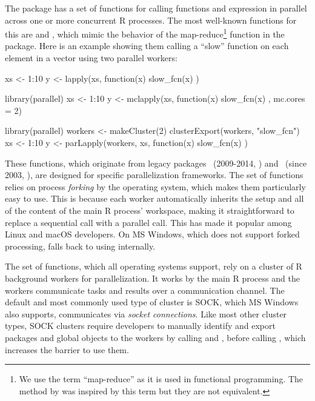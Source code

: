 The  package has a set of functions for calling
functions and expression in parallel across one or more concurrent R
processes. The most well-known functions for this
are  and , which mimic the behavior
of the map-reduce\footnote{We use the term ``map-reduce'' as it is
used in functional programming. The  method by
\citet{DeanGhemawat2004} was inspired by this term but they are not
equivalent.}
function  in the  package.  Here is an
example showing them calling a ``slow'' function on each element in a
vector using two parallel workers:
%
\begin{example}
xs <- 1:10
y <- lapply(xs, function(x) {
  slow_fcn(x)
})

library(parallel)
xs <- 1:10
y <- mclapply(xs, function(x) {
  slow_fcn(x)
}, mc.cores = 2)

library(parallel)
workers <- makeCluster(2)
clusterExport(workers, "slow_fcn")
xs <- 1:10
y <- parLapply(workers, xs, function(x) {
  slow_fcn(x)
})
\end{example}
%
These functions, which originate from legacy packages
~(2009-2014, \citet{CRAN:multicore}) and
~(since 2003, \citet{CRAN:snow}), are designed for
specific parallelization frameworks. The  set of
functions relies on process \emph{forking} by the operating system,
which makes them particularly easy to use.  This is because each
worker automatically inherits the setup and all of the content of the
main R process' workspace, making it straightforward to replace a
sequential
 call with a parallel  call. This
has made it popular among Linux and macOS developers. On MS Windows,
which does not support forked processing,  falls back
to using  internally.

The  set of functions, which all operating systems
support, rely on a cluster of R background workers for
parallelization. It works by the main R process and the workers
communicate tasks and results over a communication channel. The
default and most commonly used type of cluster is SOCK, which MS
Windows also supports, communicates via \emph{socket connections}. Like
most other cluster types, SOCK clusters require developers to manually
identify and export packages and global objects to the workers by
calling  and
, before calling , which
increases the barrier to use them.

